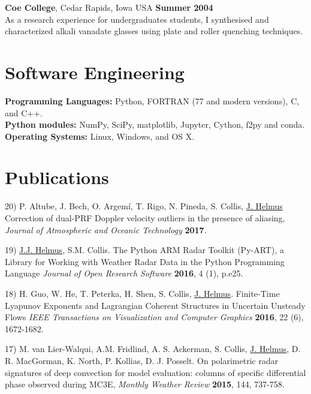 \documentclass[margin,line]{res}
\begin{document}
\begin{resume}
\vspace{-0.1in}

{\bf Coe College}, Cedar Rapids, Iowa USA \hfill {\bf Summer 2004}\\
As a research experience for undergraduates students,
I synthesised and characterized alkali vanadate glasses using plate and
roller quenching techniques.

\section{\sc Software Engineering}
{\bf Programming Languages:} Python, FORTRAN (77 and modern versions), C, and C++.\\
{\bf Python modules:} NumPy, SciPy, matplotlib, Jupyter, Cython, f2py and conda.\\
{\bf Operating Systems:}  Linux, Windows, and OS X.\\

\section{\sc Publications}
20) P. Altube, J. Bech, O. Argemí, T. Rigo, N. Pineda, S. Collis,
\underline{J.  Helmus}
Correction of dual-PRF Doppler velocity outliers in the presence of aliasing,
{\em Journal of Atmospheric and Oceanic Technology} {\bf 2017}.

19) \underline{J.J. Helmus}, S.M. Collis.
The Python ARM Radar Toolkit (Py-ART), a Library for Working with Weather
Radar Data in the Python Programming Language
{\em Journal of Open Research Software} {\bf 2016}, 4 (1), p.e25.

18) H. Guo, W. He, T. Peterka, H. Shen, S. Collis, \underline{J. Helmus}.
Finite-Time Lyapunov Exponents and Lagrangian Coherent Structures in
Uncertain Unsteady Flows
{\em IEEE Transactions on Visualization and Computer Graphics} {\bf 2016},
22 (6), 1672-1682.

17) M. van Lier-Walqui, A.M. Fridlind, A. S. Ackerman, S. Collis,
\underline{J. Helmus}, D. R. MacGorman, K. North, P. Kollias, D. J. Posselt.
On polarimetric radar signatures of deep convection for model evaluation:
columns of specific differential phase observed during MC3E,
{\em Monthly Weather Review} {\bf 2015}, 144, 737-758.


\end{resume}
\end{document}
